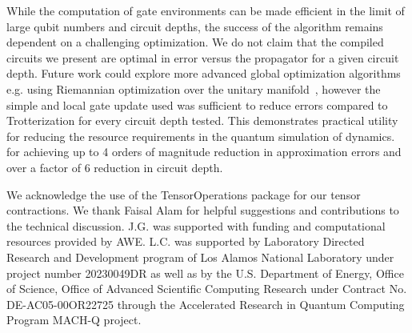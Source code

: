 \documentclass[a4paper,twocolumn,11pt,accepted=2025-06-10]{quantumarticle}
\begin{document}
While the computation of gate environments can be made efficient in the limit of large qubit numbers and circuit depths, the success of the algorithm remains dependent on a challenging optimization.
We do not claim that the compiled circuits we present are optimal in error versus the propagator for a given circuit depth. Future work could explore more advanced global optimization algorithms e.g. using Riemannian optimization over the unitary manifold~\cite{luchnikov2021riemannian}, however the simple and local gate update used was sufficient to reduce errors compared to Trotterization for every circuit depth tested. This demonstrates practical utility for reducing the resource requirements in the quantum simulation of dynamics. for achieving up to 4 orders of magnitude reduction in approximation errors and over a factor of 6 reduction in circuit depth.

\begin{acknowledgments}

We acknowledge the use of the TensorOperations package \cite{TensorOperations.jl} for our tensor contractions. We thank Faisal Alam for helpful suggestions and contributions to the technical discussion.
J.G. was supported with funding and computational resources provided by AWE.
L.C. was supported by Laboratory Directed Research and Development program of Los Alamos National Laboratory under project number 20230049DR as well as by the U.S. Department of Energy, Office of Science, Office of Advanced Scientific Computing Research under Contract No. DE-AC05-00OR22725 through the Accelerated Research in Quantum Computing Program MACH-Q project.



\end{acknowledgments}

\newpage

%


%


\clearpage 

\end{document}
